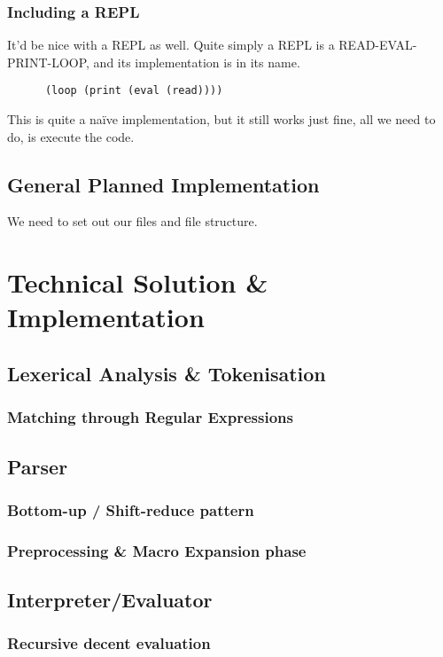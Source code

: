 \documentclass{article}
\begin{document}
  \subsubsection{Including a REPL}
    It'd be nice with a REPL as well. Quite simply a REPL is a
    READ-EVAL-PRINT-LOOP, and its implementation is in its name.
    \begin{verbatim}
      (loop (print (eval (read))))
    \end{verbatim}
    This is quite a na\"{i}ve implementation, but it still works just fine,
    all we need to do, is execute the code.

    \clearpage
  \subsection{General Planned Implementation}
    We need to set out our files and file structure.


\section{Technical Solution \& Implementation}
  \subsection{Lexerical Analysis \& Tokenisation}
    \subsubsection{Matching through Regular Expressions}
  \subsection{Parser}
    \subsubsection{Bottom-up / Shift-reduce pattern}
    \subsubsection{Preprocessing \& Macro Expansion phase}
  \subsection{Interpreter/Evaluator}
    \subsubsection{Recursive decent evaluation}
\end{document}
